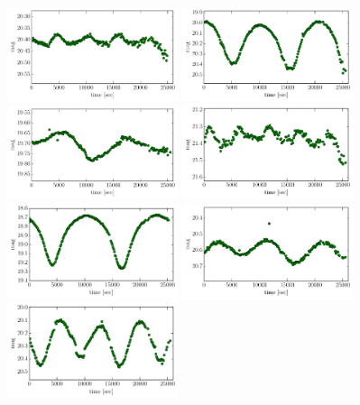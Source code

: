 \documentclass[iop, apj]{emulateapj}
\newcommand{\?}{\stackrel{?}{=}}
\begin{document}
\begin{figure}[t]
\includegraphics[width=5cm,clip,angle=90]{pic/binary/cand_14.pdf}
\includegraphics[width=5cm,clip,angle=90]{pic/binary/cand_15.pdf}
\includegraphics[width=5cm,clip,angle=90]{pic/binary/cand_16.pdf}
\includegraphics[width=5cm,clip,angle=90]{pic/binary/cand_17.pdf}
\includegraphics[width=5cm,clip,angle=90]{pic/binary/cand_18.pdf}
\includegraphics[width=5cm,clip,angle=90]{pic/binary/cand_19.pdf}
\includegraphics[width=5cm,clip,angle=90]{pic/binary/cand_20.pdf}

\end{figure}
\end{document}
